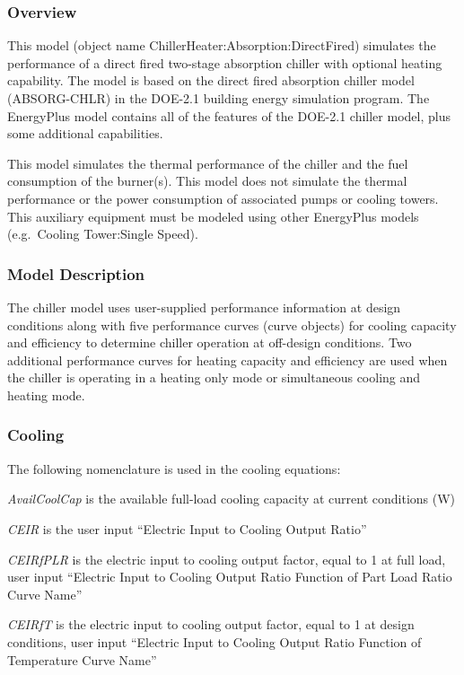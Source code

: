\subsubsection{Overview}\label{overview-009}

This model (object name ChillerHeater:Absorption:DirectFired) simulates the performance of a direct fired two-stage absorption chiller with optional heating capability. The model is based on the direct fired absorption chiller model (ABSORG-CHLR) in the DOE-2.1 building energy simulation program. The EnergyPlus model contains all of the features of the DOE-2.1 chiller model, plus some additional capabilities.

This model simulates the thermal performance of the chiller and the fuel consumption of the burner(s). This model does not simulate the thermal performance or the power consumption of associated pumps or cooling towers. This auxiliary equipment must be modeled using other EnergyPlus models (e.g.~Cooling Tower:Single Speed).

\subsubsection{Model Description}\label{model-description-006}

The chiller model uses user-supplied performance information at design conditions along with five performance curves (curve objects) for cooling capacity and efficiency to determine chiller operation at off-design conditions. Two additional performance curves for heating capacity and efficiency are used when the chiller is operating in a heating only mode or simultaneous cooling and heating mode.

\subsubsection{Cooling}\label{cooling}

The following nomenclature is used in the cooling equations:

\emph{AvailCoolCap} is the available full-load cooling capacity at current conditions (W)

\emph{CEIR} is the user input ``Electric Input to Cooling Output Ratio''

\emph{CEIRfPLR} is the electric input to cooling output factor, equal to 1 at full load, user input ``Electric Input to Cooling Output Ratio Function of Part Load Ratio Curve Name''

\emph{CEIRfT} is the electric input to cooling output factor, equal to 1 at design conditions, user input ``Electric Input to Cooling Output Ratio Function of Temperature Curve Name''


